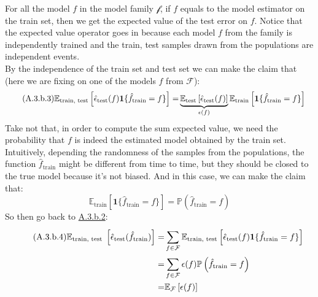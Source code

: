 \documentclass[]{article}
\begin{document}
        For all the model $f$ in the model family $\mathcal{f}$, if $f$ equals to the model estimator on the train set, then we get the expected value of the test error on $f$. Notice that the expected value operator goes in because each model $f$ from the family is independently trained and the train, test samples drawn from the populations are independent events. 
        \\[1em]
        By the independence of the train set and test set we can make the claim that (here we are fixing on one of the models $f$ from $\mathcal{F}$): 
        \begin{align*}\tag{A.3.b.3}\label{eqn:A.3.b.3}
            \mathbb{E}_{\text{train, test}}
            \left[
                \hat{\epsilon}_{\text{\text{test}}}(f)\mathbf{1}\{\hat{f}_\text{train} = f\}
            \right]
            =&
            \underbrace{\mathbb{E}_\text{test}\left[
                \hat{\epsilon}_\text{test}(f)
            \right]}_{\epsilon(f)}
            \mathbb{E}_{\text{train}}\left[ 
                \mathbf{1}\{\hat{f}_\text{train} = f\}
            \right]
        \end{align*}
        Take not that, in order to compute the sum expected value, we need the probability that $f$ is indeed the estimated model obtained by the train set. Intuitively, depending the randomness of the samples from the populations, the function $\hat{f}_\text{train}$ might be different from time to time, but they should be closed to the true model because it's not biased. And in this case, we can make the claim that:
        \begin{equation*}\tag{A.3.b.4}\label{eqn:A.3.b.4}
            \mathbb{E}_\text{train}\left[\mathbf{1}\{\hat{f}_\text{train} = f\}\right] 
            =
            \mathbb{P}\left(\hat{f}_\text{train} = f\right)
        \end{equation*}
        So then go back to \hyperref[eqn:A.3.b.2]{A.3.b.2}: 
        \begin{align*}\tag{A.3.b.4}\label{eqn:A.3.b.4}
            \mathbb{E}_{\text{train, test }}\left[
                \hat{\epsilon}_\text{test}
                (\hat{f}_\text{train})
            \right]
            = &
            \sum_{f\in\mathcal{F}}^{}\mathbb{E}_\text{train, test}
            \left[
                \hat{\epsilon}_{\text{\text{test}}}(f)\mathbf{1}\{\hat{f}_\text{train} = f\}
            \right]
            \\
            =& 
            \sum_{f \in \mathcal{F}}^{}
                \epsilon(f)\mathbb{P}\left(\hat{f}_\text{train} =  f\right)
            \\
            =& 
            \mathbb{E}_\mathcal{F}\left[\epsilon(f)\right]
        \end{align*}
\end{document}
